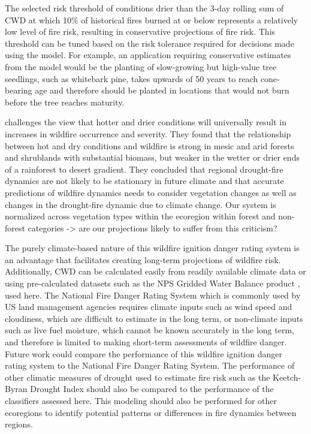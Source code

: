 \documentclass[11pt]{article}
\begin{document}
The selected risk threshold of conditions drier than the 3-day rolling sum of CWD at which 10\% of historical fires burned at or below represents a relatively low level of fire risk, resulting in conservative projections of fire risk.  This threshold can be tuned based on the risk tolerance required for decisions made using the model.  For example, an application requiring conservative estimates from the model would be the planting of slow-growing but high-value tree seedlings, such as whitebark pine, takes upwards of 50 years to reach cone-bearing age and therefore should be planted in locations that would not burn before the tree reaches maturity.

\citet{mckenzieClimateChangeEcohydrology2017} challenges the view that hotter and drier conditions will universally result in increases in wildfire occurrence and severity. They found that the relationship between hot and dry conditions and wildfire is strong in mesic and arid forests and shrublands with substantial biomass, but weaker in the wetter or drier ends of a rainforest to desert gradient.  They concluded that regional drought-fire dynamics are not likely to be stationary in future climate and that accurate predictions of wildfire dynamics needs to consider vegetation changes  as well as changes in the drought-fire dynamic due to climate change. Our system is normalized across vegetation types within the ecoregion within forest and non-forest categories -> are our projections likely to suffer from this criticism?

The purely climate-based nature of this wildfire ignition danger rating system is an advantage that facilitates creating long-term projections of wildfire risk. Additionally, CWD can be calculated easily from readily available climate data or using pre-calculated datasets such as the NPS Gridded Water Balance product \citep{tercekHistoricalChangesPlant2021}, used here. The National Fire Danger Rating System \citep{degrootChapter11Wildland2015} which is commonly used by US land management agencies requires climate inputs such as wind speed and cloudiness, which are difficult to estimate in the long term, or non-climate inputs such as live fuel moisture, which cannot be known accurately in the long term, and therefore is limited to making short-term assessments of wildfire danger. Future work could compare the performance of this wildfire ignition danger rating system to the National Fire Danger Rating System. The performance of other climatic measures of drought used to estimate fire risk such as the Keetch-Byran Drought Index \citep{degrootChapter11Wildland2015} should also be compared to the performance of the classifiers assessed here.  This modeling should also be performed for other ecoregions to identify potential patterns or differences in fire dynamics between regions. 
\end{document}
